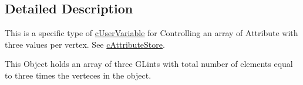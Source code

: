 \subsection{Detailed Description}
This is a specific type of \hyperlink{classc_user_variable}{cUserVariable} for Controlling an array of Attribute with three values per vertex. See \hyperlink{classc_attribute_store}{cAttributeStore}. 

This Object holds an array of three GLints with total number of elements equal to three times the verteces in the object. 